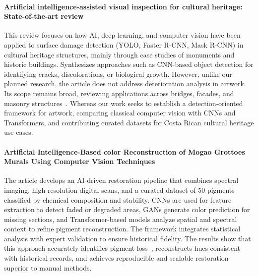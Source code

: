 \documentclass[conference]{IEEEtran}
\begin{document}
\medskip
\paragraph*{Artificial intelligence-assisted visual inspection for cultural heritage: State-of-the-art review}

This review focuses on how AI, deep learning, and computer vision have been applied to surface damage detection (YOLO, Faster R-CNN, Mask R-CNN) in cultural heritage structures, mainly through case studies of monuments and historic buildings. Synthesizes approaches such as CNN-based object detection for identifying cracks, discolorations, or biological growth. However, unlike our planned research, the article does not address deterioration analysis in artwork. Its scope remains broad, reviewing applications across bridges, facades, and masonry structures~\cite{mishra_artificial_2024}. Whereas our work seeks to establish a detection-oriented framework for artwork, comparing classical computer vision with CNNs and Transformers, and contributing curated datasets for Costa Rican cultural heritage use cases.

\medskip
\paragraph*{Artificial Intelligence-Based color Reconstruction of Mogao Grottoes Murals Using Computer Vision Techniques}

The article develops an AI-driven restoration pipeline that combines spectral imaging, high-resolution digital scans, and a curated dataset of 50 pigments classified by chemical composition and stability. CNNs are used for feature extraction to detect faded or degraded areas, GANs generate color prediction for missing sections, and Transformer-based models analyze spatial and spectral context to refine pigment reconstruction. The framework integrates statistical analysis with expert validation to ensure historical fidelity. The results show that this approach accurately identifies pigment loss~\cite{yi_zhang_artificial_2025}, reconstructs hues consistent with historical records, and achieves reproducible and scalable restoration superior to manual methods.

\medskip
\end{document}
